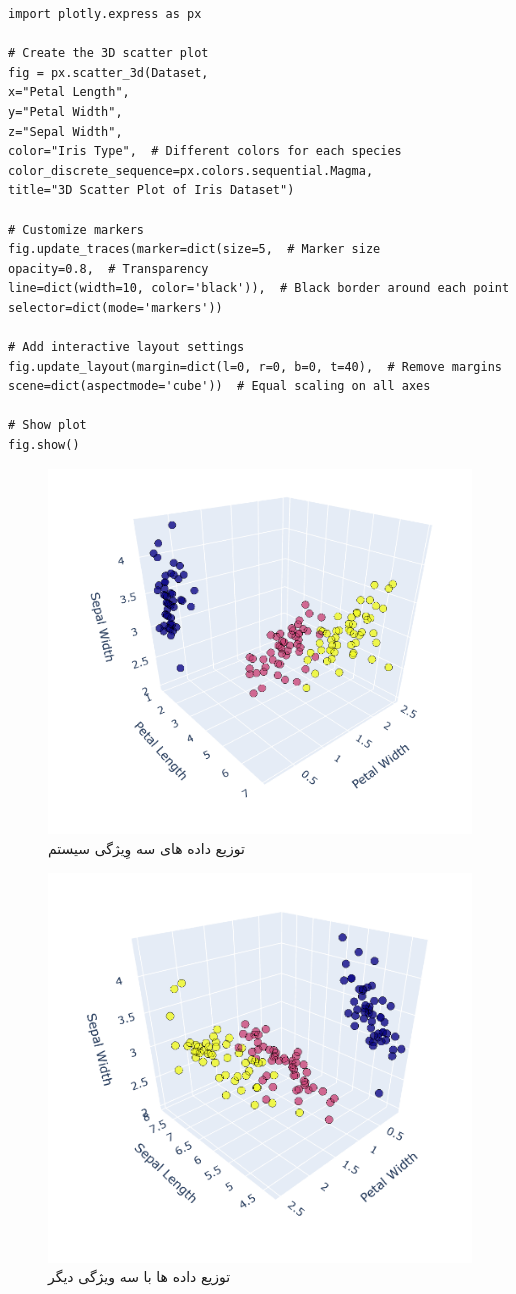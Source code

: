 \begin{verbatim}
import plotly.express as px

# Create the 3D scatter plot
fig = px.scatter_3d(Dataset,
x="Petal Length",
y="Petal Width",
z="Sepal Width",
color="Iris Type",  # Different colors for each species
color_discrete_sequence=px.colors.sequential.Magma, 
title="3D Scatter Plot of Iris Dataset")

# Customize markers
fig.update_traces(marker=dict(size=5,  # Marker size
opacity=0.8,  # Transparency
line=dict(width=10, color='black')),  # Black border around each point
selector=dict(mode='markers'))

# Add interactive layout settings
fig.update_layout(margin=dict(l=0, r=0, b=0, t=40),  # Remove margins
scene=dict(aspectmode='cube'))  # Equal scaling on all axes

# Show plot
fig.show()
\end{verbatim}
\begin{figure}[H]
	\centering
	\includegraphics[width=0.7\linewidth]{../img/10}
	\caption{توزیع داده های سه وِیژگی سیستم}
	\label{fig:10}
\end{figure}
\begin{figure}[H]
	\centering
	\includegraphics[width=0.7\linewidth]{../img/11}
	\caption{توزیع داده ها با سه ویژگی دیگر}
	\label{fig:11}
\end{figure}

